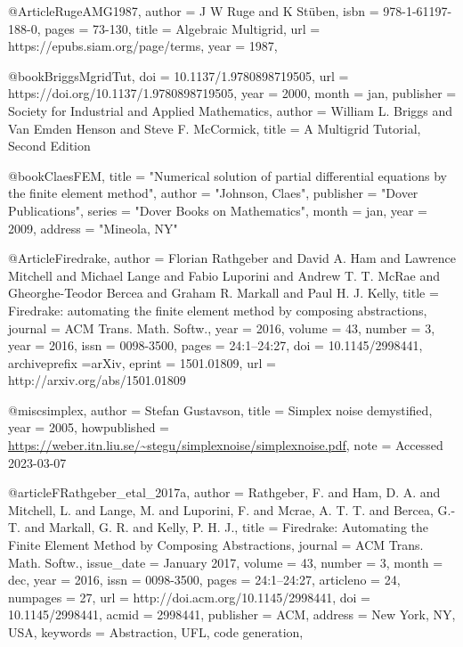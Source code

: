 @Article{RugeAMG1987,
   author = {J W Ruge and K Stüben},
   isbn = {978-1-61197-188-0},
   pages = {73-130},
   title = {Algebraic Multigrid},
   url = {https://epubs.siam.org/page/terms},
   year = {1987},
}

@book{BriggsMgridTut,
  doi = {10.1137/1.9780898719505},
  url = {https://doi.org/10.1137/1.9780898719505},
  year = {2000},
  month = jan,
  publisher = {Society for Industrial and Applied Mathematics},
  author = {William L. Briggs and Van Emden Henson and Steve F. McCormick},
  title = {A Multigrid Tutorial,  Second Edition}
}

@book{ClaesFEM,
  title     = "Numerical solution of partial differential equations by the
               finite element method",
  author    = "Johnson, Claes",
  publisher = "Dover Publications",
  series    = "Dover Books on Mathematics",
  month     =  jan,
  year      =  2009,
  address   = "Mineola, NY"
}

@Article{Firedrake,
  author =       {Florian Rathgeber and David A. Ham and Lawrence
                  Mitchell and Michael Lange and Fabio Luporini and
                  Andrew T. T. McRae and Gheorghe-Teodor Bercea and
                  Graham R. Markall and Paul H. J. Kelly},
  title =        {Firedrake: automating the finite element method by
                  composing abstractions},
  journal =      {ACM Trans. Math. Softw.},
  year =         2016,
  volume =       {43},
  number =       {3},
  year =         {2016},
  issn =         {0098-3500},
  pages =        {24:1--24:27},
  doi =          {10.1145/2998441},
  archiveprefix ={arXiv},
  eprint =       {1501.01809},
  url =          {http://arxiv.org/abs/1501.01809}
}

@misc{simplex,
  author = {Stefan Gustavson},
  title = {Simplex noise demystified},
  year = 2005,
  howpublished = {\url{https://weber.itn.liu.se/~stegu/simplexnoise/simplexnoise.pdf}},
  note = {Accessed 2023-03-07}
}

@article{FRathgeber_etal_2017a,
  author = {Rathgeber, F. and Ham, D. A. and Mitchell, L. and Lange, M. and Luporini, F. and Mcrae, A. T. T. and Bercea, G.-T. and    Markall, G. R. and Kelly, P. H. J.},
  title = {Firedrake: Automating the Finite Element Method by Composing Abstractions},
  journal = {ACM Trans. Math. Softw.},
  issue_date = {January 2017},
  volume = {43},
  number = {3},
  month = dec,
  year = {2016},
  issn = {0098-3500},
  pages = {24:1--24:27},
  articleno = {24},
  numpages = {27},
  url = {http://doi.acm.org/10.1145/2998441},
  doi = {10.1145/2998441},
  acmid = {2998441},
  publisher = {ACM},
  address = {New York, NY, USA},
  keywords = {Abstraction, UFL, code generation},
 }